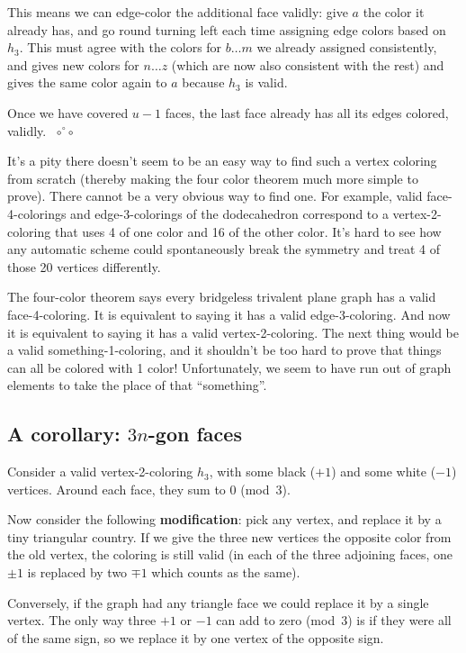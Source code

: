 \documentclass[12pt]{article}
\let\S\scriptstyle
\def\qed{ ${\S\circ}\!{}^\circ\!{\S\circ}$}
\begin{document}
This means we can edge-color the additional face validly: give $a$ the color
it already has, and go round turning left each time assigning edge colors
based on $h_3$. This must agree with the colors for $b\dots m$ we already
assigned consistently, and gives new colors for $n\dots z$ (which are now also
consistent with the rest) and gives the same color again to $a$ because $h_3$
is valid.

Once we have covered $u-1$ faces, the last face already has all its edges
colored, validly.~\qed

It's a pity there doesn't seem to be an easy way to find such a vertex
coloring from scratch (thereby making the four color theorem much more simple to prove). There cannot be a very obvious way to find one. For example, valid
face-4-colorings and edge-3-colorings of the dodecahedron correspond to a
vertex-2-coloring that uses 4 of one color and 16 of the other color. It's hard to see how any automatic scheme could spontaneously break the symmetry and
treat 4 of those 20 vertices differently.

The four-color theorem says every bridgeless trivalent plane graph has a valid
face-4-coloring. It is equivalent to saying it has a valid edge-3-coloring.
And now it is equivalent to saying it has a valid vertex-2-coloring. The next
thing would be a valid something-1-coloring, and it shouldn't be too hard to
prove that things can all be colored with 1 color! Unfortunately, we seem to
have run out of graph elements to take the place of that ``something''.

\vfill\pagebreak
\subsection*{A corollary: $3n$-gon faces}

Consider a valid vertex-2-coloring $h_3$, with some black ($+1$) and some
white ($-1$) vertices. Around each face, they sum to 0 (mod~3).

Now consider the following {\bf modification}: pick any vertex, and replace it
by a tiny triangular country. If we give the three new vertices the opposite
color from the old vertex, the coloring is still valid (in each of the three
adjoining faces, one $\pm1$ is replaced by two $\mp1$ which counts as the same).

Conversely, if the graph had any triangle face we could replace it by a single
vertex. The only way three $+1$ or $-1$ can add to zero (mod~3) is if they
were all of the same sign, so we replace it by one vertex of the opposite
sign.
\end{document}
